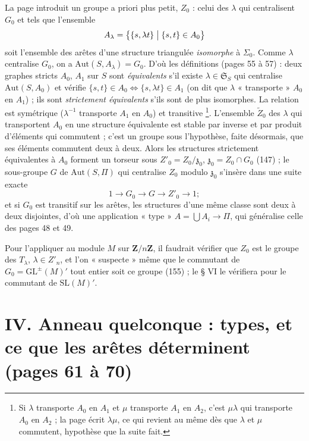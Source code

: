 \documentclass[11pt,a4paper]{article}
\begin{document}
La page introduit un groupe a priori plus petit, $Z_0$ : celui des $\lambda$
qui centralisent $G_0$ et tels que l'ensemble
\[
  A_\lambda = \bigl\{ \{s, \lambda t\} \bigm| \{s, t\} \in A_0 \bigr\}
\]
soit l'ensemble des arêtes d'une structure triangulée \emph{isomorphe} à
$\Sigma_0$. Comme $\lambda$ centralise $G_0$, on a $\mathrm{Aut}(S, A_\lambda) =
G_0$. D'où les définitions (pages 55 à 57) : deux graphes stricts $A_0$, $A_1$
sur $S$ sont \emph{équivalents} s'il existe $\lambda \in \mathfrak{S}_S$ qui
centralise $\mathrm{Aut}(S, A_0)$ et vérifie $\{s, t\} \in A_0 \iff \{s,
\lambda t\} \in A_1$ (on dit que $\lambda$ « transporte » $A_0$ en $A_1$) ; ils
sont \emph{strictement équivalents} s'ils sont de plus isomorphes. La relation
est symétrique ($\lambda^{-1}$ transporte $A_1$ en $A_0$) et transitive
\footnote{Si $\lambda$ transporte $A_0$ en $A_1$ et $\mu$ transporte $A_1$ en
$A_2$, c'est $\mu\lambda$ qui transporte $A_0$ en $A_2$ ; la page écrit
$\lambda\mu$, ce qui revient au même dès que $\lambda$ et $\mu$ commutent,
hypothèse que la suite fait.}. L'ensemble $\widetilde{Z}_0$ des $\lambda$
qui transportent $A_0$ en une structure équivalente est stable par inverse et
par produit d'éléments qui commutent ; c'est un groupe sous l'hypothèse,
faite désormais, que ses éléments commutent deux à deux. Alors les structures
strictement équivalentes à $A_0$ forment un torseur sous $Z'_0 =
Z_0/\mathfrak{z}_0$, $\mathfrak{z}_0 = Z_0 \cap G_0$ (147) ; le sous-groupe $G$
de $\mathrm{Aut}(S, \Pi)$ qui centralise $Z_0$ modulo $\mathfrak{z}_0$
s'insère dans une suite exacte
\[
  1 \longrightarrow G_0 \longrightarrow G \longrightarrow Z'_0 \longrightarrow 1 ;
\]
et si $G_0$ est transitif sur les arêtes, les structures d'une même classe sont
deux à deux disjointes, d'où une application « type » $A = \bigcup A_i \to
\Pi$, qui généralise celle des pages 48 et 49.

Pour l'appliquer au module $M$ sur $\mathbf{Z}/n\mathbf{Z}$, il faudrait
vérifier que $Z_0$ est le groupe des $T_\lambda$, $\lambda \in Z'_n$, et l'on
« suspecte » même que le commutant de $G_0 = \mathrm{GL}^{\pm}(M)'$ tout entier
soit ce groupe (155) ; le § VI le vérifiera pour le commutant de
$\mathrm{SL}(M)'$.

\section*{IV. Anneau quelconque : types, et ce que les arêtes déterminent (pages 61 à 70)}
\end{document}
